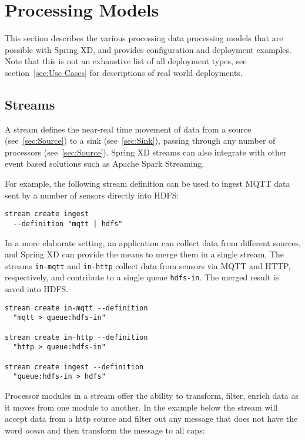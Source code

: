 \section{Processing Models}
This section describes the various processing data processing models that are possible with
Spring XD, and provides configuration and deployment examples.
Note that this is not an exhaustive list of all
deployment types, see section~\ref{sec:Use Cases} for descriptions of real
world deployments.

\subsection {Streams}

A stream defines the near-real time movement of data from a source (see~\ref{sec:Source}) to a
sink (see~\ref{sec:Sink}), passing through any number of processors (see~\ref{sec:Source}).  Spring XD streams can
also integrate with other event based solutions such as Apache Spark Streaming.

For example, the following stream definition can be used to ingest
MQTT\cite{mqtt} data sent by a number of sensors directly into HDFS:

\begin{lstlisting}
stream create ingest
  --definition "mqtt | hdfs"
\end{lstlisting}

In a more elaborate setting, an application can collect data from
different sources, and Spring XD can provide the means to merge them
in a single stream. The streams \texttt{in-mqtt} and \texttt{in-http}
collect data from sensors via MQTT and HTTP, respectively, and
contribute to a single queue \texttt{hdfs-in}. The merged result
is saved into HDFS.

\begin{lstlisting}
stream create in-mqtt --definition
  "mqtt > queue:hdfs-in"

stream create in-http --definition
  "http > queue:hdfs-in"

stream create ingest --definition
  "queue:hdfs-in > hdfs"
\end{lstlisting}

Processor modules in a stream offer the ability to transform, filter,
enrich data as it moves from one module to another.  In the example below
the stream will accept data from a http source and filter out any message
that does not have the word \emph{ocean} and then transform the message
to all caps:

